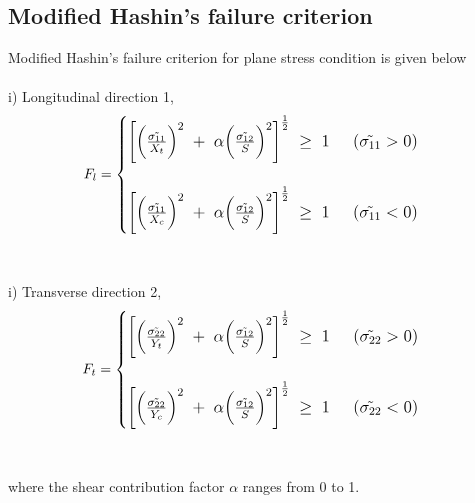 \documentclass[12pt,a4paper,twoside,openright]{report}
\begin{document}
\subsection{Modified Hashin's failure criterion}\label{Modified Hashin's failure criterion}
\indent\indent\indent Modified Hashin's failure criterion \citep{jiang2018evaluations} for plane stress condition is given below 
\\
\\
i) Longitudinal direction 1,
\\
\begin{equation}
\large{F_{l} =  
	\begin{cases}
	
		\left[ \Big(\frac{\tilde{\sigma_{11}}} {X_{t}}\Big)^{2} \; + \;\alpha  \Big(\frac{\tilde{\sigma_{12}}}{S}\Big)^{2}\right]^{\frac{1}{2}} \;  \geq  \; 1  \; \; \; \; \;  (\tilde{\sigma_{11}}  >  0)  \\
	\\
\left[ \Big(\frac{\tilde{\sigma_{11}}} {X_{c}}\Big)^{2} \; + \;\alpha  \Big(\frac{\tilde{\sigma_{12}}}{S}\Big)^{2}\right]^{\frac{1}{2}} \;  \geq  \; 1  \; \; \; \; \;  (\tilde{\sigma_{11}}  <  0)
	
	\end{cases}}
\end{equation}
\\
\\
i) Transverse direction 2,
\\
\begin{equation}
\large{F_{t} =  
	\begin{cases}
	
	\left[ 	\Big(\frac{\tilde{\sigma_{22}}} {Y_{t}}\Big)^{2} \; + \;\alpha  \Big(\frac{\tilde{\sigma_{12}}}{S}\Big)^{2} \right]^{\frac{1}{2}} \;  \geq  \; 1  \; \; \; \; \;  (\tilde{\sigma_{22}}  >  0)  \\
	\\
\left[ \Big(\frac{\tilde{\sigma_{22}}} {Y_{c}}\Big)^{2} \; + \;\alpha  \Big(\frac{\tilde{\sigma_{12}}}{S}\Big)^{2}\right]^{\frac{1}{2}} \;  \geq  \; 1  \; \; \; \; \;  (\tilde{\sigma_{22}}  <  0)
	
	\end{cases}}
\end{equation}
\\
\\
where the shear contribution factor $\alpha$ ranges from 0 to 1.
\end{document}
